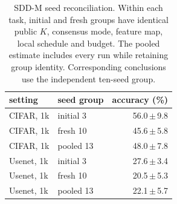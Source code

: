\begin{table}[t]
\centering
\caption{SDD-M seed reconciliation. Within each task, initial and fresh groups have identical public $K$, consensus mode, feature map, local schedule and budget. The pooled estimate includes every run while retaining group identity. Corresponding conclusions use the independent ten-seed group.}
\label{tab:seed-reconciliation}
\small\setlength{\tabcolsep}{3pt}
\begin{tabular}{@{}llr@{}}\toprule
setting & seed group & accuracy (\%) \\\midrule
CIFAR, 1k & initial 3 & 56.0\,$\pm$\,9.8 \\
CIFAR, 1k & fresh 10 & 45.6\,$\pm$\,5.8 \\
CIFAR, 1k & pooled 13 & 48.0\,$\pm$\,7.8 \\
Usenet, 1k & initial 3 & 27.6\,$\pm$\,3.4 \\
Usenet, 1k & fresh 10 & 20.5\,$\pm$\,5.3 \\
Usenet, 1k & pooled 13 & 22.1\,$\pm$\,5.7 \\
\bottomrule\end{tabular}
\end{table}
